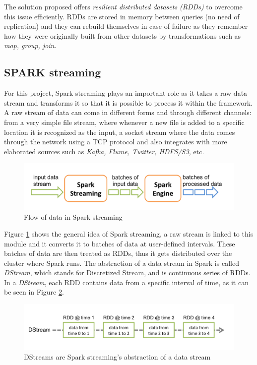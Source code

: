 The solution proposed offers \textit{resilient distributed datasets (RDDs)} to overcome this issue efficiently. RDDs are stored in memory between queries (no need of replication) and they can rebuild themselves in case of failure as they remember how they were originally built from other datasets by transformations such as \textit{map, group, join}.

\subsection{SPARK streaming}

For this project, Spark streaming plays an important role as it takes a raw data stream and transforms it so that it is possible to process it within the framework. A raw stream of data can come in different forms and through different channels: from a very simple file stream, where whenever a new file is added to a specific location it is recognized as the input, a socket stream where the data comes through the network using a TCP protocol and also integrates with more elaborated sources such as \textit{Kafka, Flume, Twitter, HDFS/S3,} etc.


\begin{figure}[h!]
 \centering
 \includegraphics[scale=0.45]{./styles/streaming-flow.png}
 \caption{Flow of data in Spark streaming}
 \label{fig:streamFlow}
\end{figure}

Figure \ref{fig:streamFlow} shows the general idea of Spark streaming\cite{sparkStreaming}, a raw stream is linked to this module and it converts it to batches of data at user-defined intervals. These batches of data are then treated as RDDs, thus it gets distributed over the cluster where Spark runs. The abstraction of a data stream in Spark is called \textit{DStream}, which stands for Discretized Stream, and is continuous series of RDDs. In a \textit{DStream}, each RDD contains data from a specific interval of time, as it can be seen in Figure \ref{fig:dstream}.


\begin{figure}[h!]
 \centering
 \includegraphics[scale=0.45]{./styles/streaming-dstream.png}
 \caption{DStreams are Spark streaming's abstraction of a data stream}
 \label{fig:dstream}
\end{figure}

